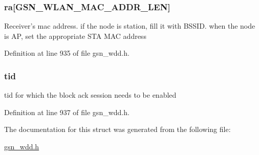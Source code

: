 \hypertarget{a00272_a1d97eb2e070b4a95218b41f6abbff9d7}{
\subsubsection[{ra}]{ {\bf ra}\mbox{[}GSN\_\-WLAN\_\-MAC\_\-ADDR\_\-LEN\mbox{]}}}
\label{a00272_a1d97eb2e070b4a95218b41f6abbff9d7}
Receiver's mac address. if the node is station, fill it with BSSID. when the node is AP, set the appropriate STA MAC address 

Definition at line 935 of file gsn\_\-wdd.h.

\hypertarget{a00272_abf69ed815c8482f9995e41bc0aff9043}{
\subsubsection[{tid}]{ {\bf tid}}}
\label{a00272_abf69ed815c8482f9995e41bc0aff9043}
tid for which the block ack session needs to be enabled 

Definition at line 937 of file gsn\_\-wdd.h.



The documentation for this struct was generated from the following file:\begin{DoxyCompactItemize}
\item 
\hyperlink{a00603}{gsn\_\-wdd.h}\end{DoxyCompactItemize}
